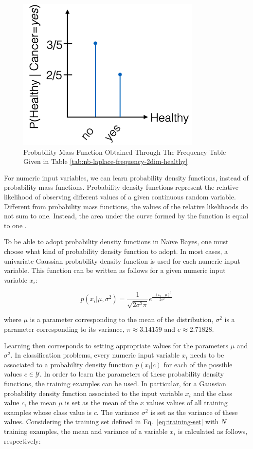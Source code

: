 \begin{figure}[h]
\centering
\includegraphics[scale=0.4]{"Part 3 - Learning Systems/Supervised Learning/Naive Bayes/figures/nb-mass-function.png"} %
\caption{Probability Mass Function Obtained Through The Frequency Table Given in Table \ref{tab:nb-laplace-frequency-2dim-healthy}}
\end{figure}

For numeric input variables, we can learn probability density functions, instead of probability mass functions. Probability density functions represent the relative likelihood of observing different values of a given continuous random variable. Different from probability mass functions, the values of the relative likelihoods do not sum to one. Instead, the area under the curve formed by the function is equal to one \cite{MathsForML}. 

To be able to adopt probability density functions in Na\"{i}ve Bayes, one must choose what kind of probability density function to adopt. In most cases, a univariate Gaussian probability density function is used for each numeric input variable. This function can be written as follows for a given numeric input variable $x_i$:

\[ p(x_i|\mu,\sigma^2) = \frac{1}{\sqrt{2 \sigma^2 \pi}} e^{\frac{-(x_i - \mu)^2}{2 \sigma^2}}\]

\noindent where $\mu$ is a parameter corresponding to the mean of the distribution, $\sigma^2$ is a parameter corresponding to its variance, $\pi \approx 3.14159$ and $e \approx 2.71828$.

Learning then corresponds to setting appropriate values for the parameters $\mu$ and $\sigma^2$. In classification problems, every numeric input variable $x_i$ needs to be associated to a probability density function $p(x_i|c)$ for each of the possible values $c \in \mathcal{Y}$. In order to learn the parameters of these probability density functions, the training examples can be used. In particular, for a Gaussian probability density function associated to the input variable $x_i$ and the class value $c$, the mean $\mu$ is set as the mean of the $x$ values values of all training examples whose class value is $c$. The variance $\sigma^2$ is set as the variance of these values. Considering the training set defined in Eq.~\ref{eq:training-set} with $N$ training examples, the mean and variance of a variable $x_i$ is calculated as follows, respectively:

